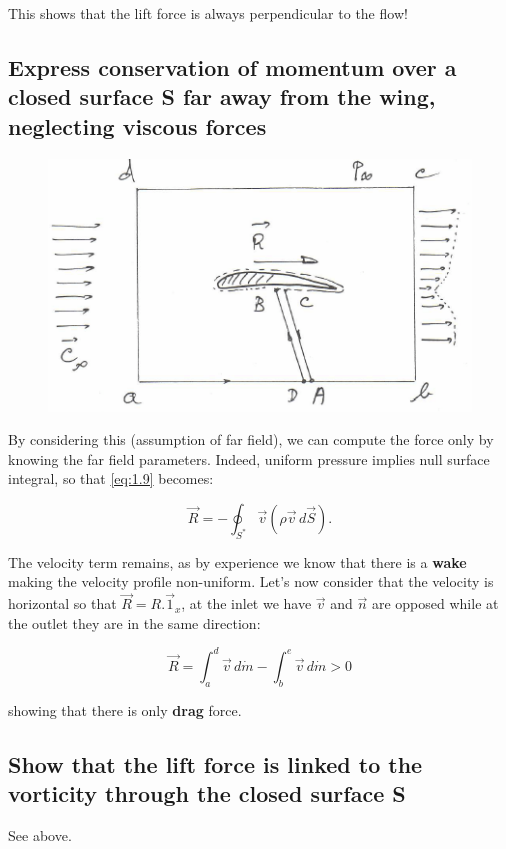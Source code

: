 \documentclass[british,french,11pt, a4paper, openany]{article}
\begin{document}
This shows that the lift force is always perpendicular to the flow!


\subsection{Express conservation of momentum over a closed surface S far away from
	the wing, neglecting viscous forces}
\begin{figure}
	\vspace{-5mm}
	\includegraphics[scale=0.4]{ch1/2}
\end{figure}
By considering this (assumption of far field), we can compute the force only by knowing the far field parameters. Indeed, uniform pressure implies null surface integral, so that \eqref{eq:1.9} becomes:

\begin{equation}
\vec{R} = -\oint _{S^*} \vec{v} (\rho \vec{v} \, d\vec{S}).
\end{equation}

The velocity term remains, as by experience we know that there is a \textbf{wake} making the velocity profile non-uniform. Let's now consider that the velocity is horizontal so that $\vec{R} = R.\vec{1}_x$, at the inlet we have $\vec{v}$ and $\vec{n}$ are opposed while at the outlet they are in the same direction: 

\begin{equation}
\vec{R} = \int _a^d \vec{v}\, d\dot{m} - \int _b^e \vec{v}\, d\dot{m} > 0
\end{equation}

showing that there is only \textbf{drag} force.

\subsection{Show that the lift force is linked to the vorticity through the closed surface S}
See above.
\end{document}
